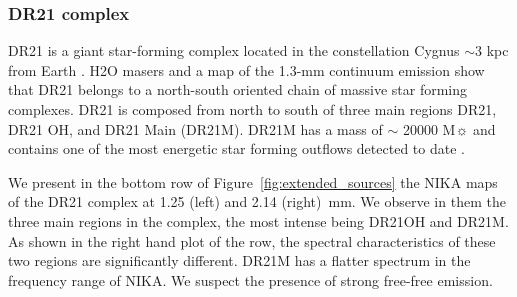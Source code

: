 



\subsubsection*{DR21 complex}
DR21 is a giant star-forming complex located in the constellation Cygnus
$\sim 3$ kpc from Earth \citep{1982ApJ...261..550C, DR21_2, DR21_1}.  H2O masers
\citep{1977A&AS...30..145G} and a map of the 1.3-mm continuum emission
\citep{2005IAUS..227..151M} show that DR21 belongs to a north-south oriented
chain of massive star forming complexes. DR21 is composed from north to south
of three main regions DR21, DR21 OH, and DR21 Main (DR21M). DR21M has a mass of
$\sim$ 20000 M$\sun$ and contains one of the most energetic star forming
outflows detected to date \citep{1991ApJ...366..474G,1991ApJ...374..540G,1992ApJ...392..602G}.

We present in the bottom row of Figure~\ref{fig:extended_sources} the NIKA
maps of the DR21 complex at 1.25 (left) and 2.14 (right)~mm. We observe in
them the three main regions in the complex, the most intense being DR21OH and
DR21M. As shown in the right hand plot of the row, the spectral characteristics of
these two regions are significantly different. DR21M has a flatter spectrum in
the frequency range of NIKA.  We suspect the presence of strong free-free
emission.




